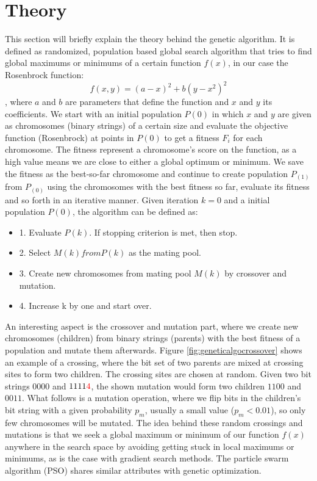 \section{Theory}\label{sec:theory}

This section will briefly explain the theory behind the genetic algorithm. It is defined as randomized, population based global search algorithm that tries to find global maximums or minimums of a certain function $f(x)$, in our case the Rosenbrock function: $$f(x,y) = (a-x)^2+b(y-x^2)^2$$, where $a$ and $b$ are parameters that define the function and $x$ and $y$ its coefficients. We start with an initial population $P(0)$ in which $x$ and $y$ are given as chromosomes (binary strings) of a certain size and evaluate the objective function (Rosenbrock) at points in $P(0)$ to get a fitness $F_{i}$ for each chromosome. The fitness represent a chromosome's score on the function, as a high value means we are close to either a global optimum or minimum. We save the fitness as the best-so-far chromosome and continue to create population $P_(1)$ from $P_(0)$ using the chromosomes with the best fitness so far, evaluate its fitness and so forth in an iterative manner. Given iteration $k=0$ and a initial population $P(0)$, the algorithm can be defined as\cite{Chong}:

\begin{itemize}
	\item 1. Evaluate $P(k)$. If stopping criterion is met, then stop.
	\item 2. Select $M(k) from P(k)$ as the mating pool.
	\item 3. Create new chromosomes from mating pool $M(k)$ by crossover and mutation.
	\item 4. Increase k by one and start over.
\end{itemize}

An interesting aspect is the crossover and mutation part, where we create new chromosomes (children) from binary strings (parents) with the best fitness of a population and mutate them afterwards. Figure \ref{fig:geneticalgocrossover} shows an example of a crossing, where the bit set of two parents are mixed at crossing sites to form two children. The crossing sites are chosen at random. Given two bit strings $0000$ and $1111{\color{red}4}$, the shown mutation would form two children $1100$ and $0011$. What follows is a mutation operation, where we flip bits in the children's bit string with a given probability $p_{m}$, usually a small value ($p_{m} < 0.01$), so only few chromosomes will be mutated. The idea behind these random crossings and mutations is that we seek a global maximum or minimum of our function $f(x)$ anywhere in the search space by avoiding getting stuck in local maximums or minimums, as is the case with gradient search methods. The particle swarm algorithm (PSO) shares similar attributes with genetic optimization.


